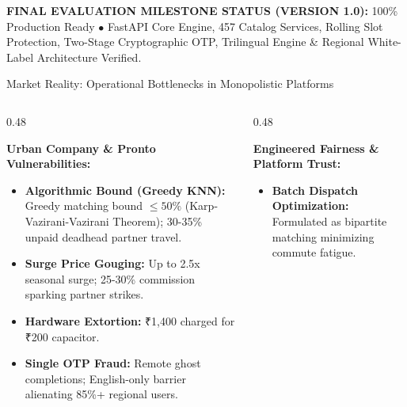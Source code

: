 \documentclass[aspectratio=169,11pt]{beamer}
\begin{document}
\begin{frame}[plain]
\begin{tcolorbox}[colback=white,colframe=SmartGold,arc=4mm,width=\textwidth,height=0.92\textheight,halign=center]
    \vspace{0.2cm}
    \begin{tcolorbox}[colback=green!8,colframe=SmartGreen!80,arc=2mm]
      {\scriptsize \textbf{\color{SmartGreen}FINAL EVALUATION MILESTONE STATUS (VERSION 1.0):} \color{SmartDark}100\% Production Ready $\bullet$ FastAPI Core Engine, 457 Catalog Services, Rolling Slot Protection, Two-Stage Cryptographic OTP, Trilingual Engine \& Regional White-Label Architecture Verified.}
    \end{tcolorbox}
  \end{tcolorbox}
\end{frame}

\begin{frame}{Market Reality: Operational Bottlenecks in Monopolistic Platforms}
\begin{columns}[T]
  \begin{column}{0.48\textwidth}
    \begin{tcolorbox}[colback=white,colframe=SmartAlert,arc=3mm,title=\textbf{\scriptsize INCUMBENT MONOPOLY DEFICIENCIES}]
      {\scriptsize \textbf{Urban Company \& Pronto Vulnerabilities:}}
      \begin{itemize}\setlength\itemsep{0.2em}
        \item \textbf{\tiny Algorithmic Bound (Greedy KNN):} Greedy matching bound $\le 50\%$ (Karp-Vazirani-Vazirani Theorem); 30-35\% unpaid deadhead partner travel.
        \item \textbf{\tiny Surge Price Gouging:} Up to 2.5x seasonal surge; 25-30\% commission sparking partner strikes.
        \item \textbf{\tiny Hardware Extortion:} ₹1,400 charged for ₹200 capacitor.
        \item \textbf{\tiny Single OTP Fraud:} Remote ghost completions; English-only barrier alienating 85\%+ regional users.
      \end{itemize}
    \end{tcolorbox}
  \end{column}
  \begin{column}{0.48\textwidth}
    \begin{tcolorbox}[colback=white,colframe=SmartGreen,arc=3mm,title=\textbf{\scriptsize SMARTSERVE COUNTERMEASURES}]
      {\scriptsize \textbf{Engineered Fairness \& Platform Trust:}}
      \begin{itemize}\setlength\itemsep{0.2em}
        \item \textbf{\tiny Batch Dispatch Optimization:} Formulated as bipartite matching minimizing commute fatigue.

\end{itemize}
\end{tcolorbox}
\end{column}
\end{columns}
\end{frame}
\end{document}
